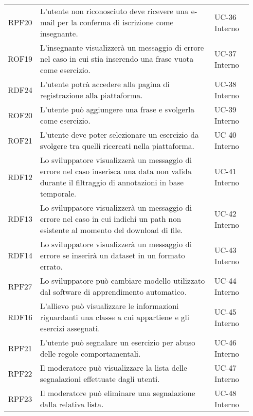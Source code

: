 \begin{tabularx}{\textwidth}{| c | p{10cm} | X |}
		RPF20 & L'utente non riconosciuto deve ricevere una e-mail per la conferma di iscrizione come insegnante. & UC-36 \newline Interno\\
		ROF19 & L'insegnante visualizzerà un messaggio di errore nel caso in cui stia inserendo una frase vuota come esercizio. & UC-37 \newline Interno\\
		RDF24 & L'utente potrà accedere alla pagina di registrazione alla piattaforma. & UC-38 \newline Interno\\
		ROF20 & L'utente può aggiungere una frase e svolgerla come esercizio. & UC-39 \newline Interno\\
		ROF21 & L'utente deve poter selezionare un esercizio da svolgere tra quelli ricercati nella piattaforma. & UC-40 \newline Interno\\
		RDF12 & Lo sviluppatore visualizzerà un messaggio di errore nel caso inserisca una data non valida durante il filtraggio di annotazioni in base temporale. & UC-41 \newline Interno\\
		RDF13 & Lo sviluppatore visualizzerà un messaggio di errore nel caso in cui indichi un path non esistente al momento del download di file. & UC-42 \newline Interno\\
		RDF14 & Lo sviluppatore visualizzerà un messaggio di errore se inserirà un dataset in un formato errato. & UC-43 \newline Interno\\
		RPF27 & Lo sviluppatore può cambiare modello utilizzato dal software di apprendimento automatico. & UC-44 \newline Interno\\
		RDF16 & L'allievo può visualizzare le informazioni riguardanti una classe a cui appartiene e gli esercizi assegnati. & UC-45 \newline Interno\\
		RPF21 & L'utente può segnalare un esercizio per abuso delle regole comportamentali. & UC-46 \newline Interno\\
		RPF22 & Il moderatore può visualizzare la lista delle segnalazioni effettuate dagli utenti. & UC-47 \newline Interno\\
		RPF23 & Il moderatore può eliminare una segnalazione dalla relativa lista. & UC-48 \newline Interno\\

\end{tabularx}
